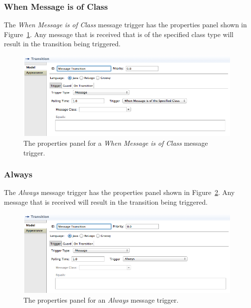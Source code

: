 \documentclass[11pt]{amsart}
\begin{document}
\subsubsection{When Message is of Class}
The \emph{When Message is of Class} message trigger has the properties panel shown in Figure~\ref{fig:message3TransitionProperties}. Any message that is received that is of the specified class type will result in the transition being triggered.

\begin{figure}
\begin{center}
\vspace{.2in}
\centerline {
\includegraphics[width=5in]{StatechartsImages/Message3TransitionProperties.png}
}
\caption{The properties panel for a \emph{When Message is of Class} message trigger.}
\label{fig:message3TransitionProperties}
\end{center}
\end{figure}

\subsubsection{Always}

The \emph{Always} message trigger has the properties panel shown in Figure~\ref{fig:message4TransitionProperties}. Any message that is received will result in the transition being triggered.

\begin{figure}
\begin{center}
\vspace{.2in}
\centerline {
\includegraphics[width=5in]{StatechartsImages/Message4TransitionProperties.png}
}
\caption{The properties panel for an \emph{Always} message trigger.}
\label{fig:message4TransitionProperties}
\end{center}
\end{figure}
\clearpage
\end{document}
